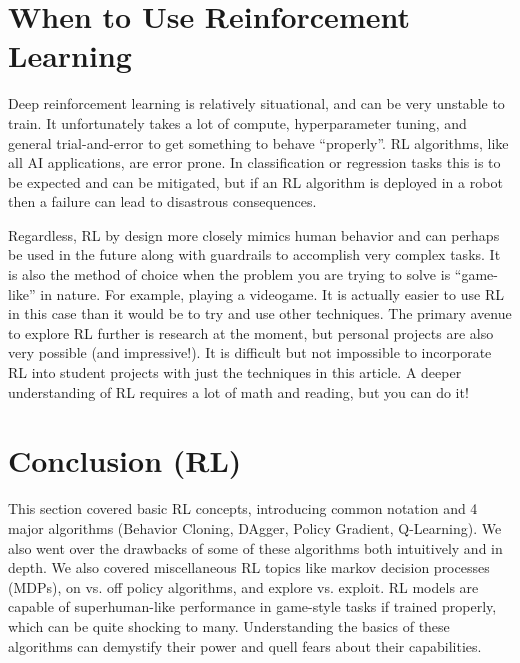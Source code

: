 \section{When to Use Reinforcement Learning}
    \large Deep reinforcement learning is relatively situational, and can be very unstable to train. It unfortunately takes a lot of compute, hyperparameter tuning, and general trial-and-error to get something to behave ``properly''. RL algorithms, like all AI applications, are error prone. In classification or regression tasks this is to be expected and can be mitigated, but if an RL algorithm is deployed in a robot then a failure can lead to disastrous consequences. 
    
    Regardless, RL by design more closely mimics human behavior and can perhaps be used in the future along with guardrails to accomplish very complex tasks. It is also the method of choice when the problem you are trying to solve is ``game-like'' in nature. For example, playing a videogame. It is actually easier to use RL in this case than it would be to try and use other techniques. The primary avenue to explore RL further is research at the moment, but personal projects are also very possible (and impressive!). It is difficult but not impossible to incorporate RL into student projects with just the techniques in this article. A deeper understanding of RL requires a lot of math and reading, but you can do it!

\section{Conclusion (RL)}
    \large This section covered basic RL concepts, introducing common notation and 4 major algorithms (Behavior Cloning, DAgger, Policy Gradient, Q-Learning). We also went over the drawbacks of some of these algorithms both intuitively and in depth. We also covered miscellaneous RL topics like markov decision processes (MDPs), on vs. off policy algorithms, and explore vs. exploit. RL models are capable of superhuman-like performance in game-style tasks if trained properly, which can be quite shocking to many. Understanding the basics of these algorithms can demystify their power and quell fears about their capabilities.
